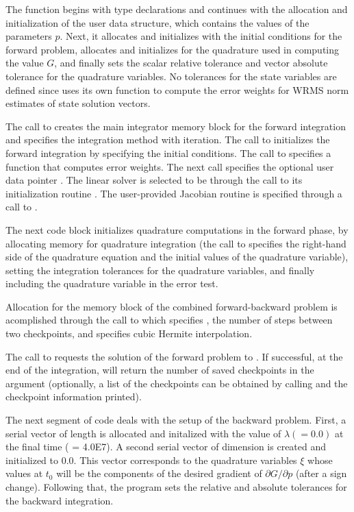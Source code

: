 The  function begins with type declarations and continues with the
allocation and initialization of the user data structure, which contains the values 
of the parameters $p$. Next, it allocates and
initializes  with the initial conditions for the forward problem, allocates and 
initializes  for the quadrature used in computing the value $G$, and finally
sets the scalar relative tolerance  and vector absolute tolerance
 for the quadrature variables.
No tolerances for the state variables are defined since 
uses its own function to compute the error weights for WRMS norm
estimates of state solution vectors.

The call to  creates the main integrator memory block for the 
forward integration and specifies the  integration method with 
 iteration. 
The call to  initializes the forward integration by specifying the 
initial conditions.
The call to  specifies a function that computes error weights.
The next call specifies the optional user data pointer .
The linear solver is selected to be {\cvdense} through the call to its 
initialization routine . The user-provided Jacobian routine 
is specified through a call to .

The next code block initializes quadrature computations in the forward phase, by
allocating {\cvodes} memory for quadrature integration (the call to
 specifies the right-hand side  of the quadrature
equation and the initial values of the quadrature variable),
setting the integration tolerances for the quadrature variables, and finally
including the quadrature variable in the error test.

Allocation for the memory block of the combined forward-backward
problem is acomplished through the call to  which
specifies , the number of steps between two
checkpoints, and specifies cubic Hermite interpolation.

The call to  requests the solution of the forward problem to .
If successful, at the end of the integration,  will return the number
of saved checkpoints in the argument  (optionally, a list of the
checkpoints can be obtained by calling  and the
checkpoint information printed).

The next segment of code deals with the setup of the backward problem. 
First, a serial vector  of length  is allocated and initalized with the
value of $\lambda (= 0.0)$ at the final time ( = 4.0E7).  A second
serial vector  of dimension  is created and initialized to $0.0$.
This vector corresponds to the quadrature variables $\xi$ whose values at $t_0$
will be the components of the desired gradient of $\partial G / \partial p$
(after a sign change).
Following that, the program sets the relative and absolute tolerances
for the backward integration.

